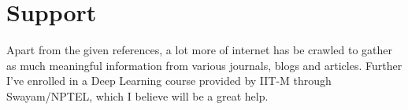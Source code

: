 \documentclass[a4paper]{article}
\begin{document}
\section*{Support}
\hspace{0.5cm} Apart from the given references, a lot more of internet has be crawled to gather as much meaningful information from various journals, blogs and articles. Further I've enrolled in a Deep Learning course provided by IIT-M through Swayam/NPTEL, which I believe will be a great help.



\end{document}
